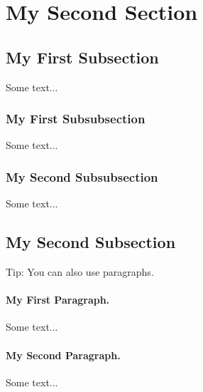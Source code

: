 \section{My Second Section}


\subsection{My First Subsection}

Some text...

\subsubsection{My First Subsubsection}

Some text...

\subsubsection{My Second Subsubsection}

Some text...


\subsection{My Second Subsection}

Tip: You can also use paragraphs.
\paragraph{My First Paragraph.} Some text...

\paragraph{My Second Paragraph.} Some text...
